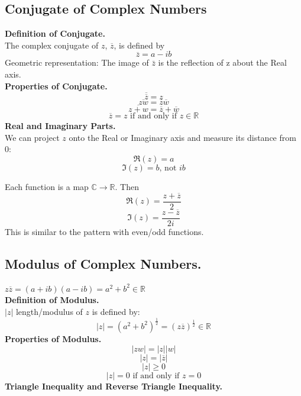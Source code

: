 \documentclass[11pt]{article}
\begin{document}
\subsection{Conjugate of Complex Numbers} 
\newcommand*\conj[1]{\overline{#1}}
\textbf{Definition of Conjugate.} \\
The complex conjugate of $z$, $\conj{z}$, is defined by 
$$\conj{z} = a - ib$$ 
Geometric representation: The image of $\bar z$ is the reflection of z about the Real axis. \\
\newline
\textbf{Properties of Conjugate.} \\
$$\conj{\conj{z}} = z$$
$$\conj{zw} = \conj{z}\conj{w}$$
$$\conj{z + w} = \conj{z} + \conj{w}$$
\begin{equation*}
\overline{z} = z \mbox{ if and only if } z \in \mathbb{R}
\end{equation*}
\textbf{Real and Imaginary Parts.} \\
\newline
\noindent We can project $z$ onto the Real or Imaginary axis and measure its distance from 0: 
$$\Re(z) = a$$
\begin{equation*}
\Im(z) = b \mbox{, not } ib
\end{equation*}

Each function is a map $\mathbb{C} \to \mathbb{R}$. Then 
$$\Re(z) = \frac{z + \conj{z}}{2}$$
$$\Im(z) = \frac{z - \conj{z}}{2i}$$
This is similar to the pattern with even/odd functions. 

\subsection{Modulus of Complex Numbers.}
$z\conj{z} = (a + ib)(a - ib) = a^2 + b^2 \in \mathbb{R}$  \\

\textbf{Definition of Modulus.} \\
$|z|$ length/modulus of $z$ is defined by:
$$|z| = (a^2 + b^2)^{\frac{1}{2}} = (z\conj{z})^{\frac{1}{2}} \in \mathbb{R}$$
\newline
\textbf{Properties of Modulus.} \\
$$|zw| = |z||w|$$ 
$$|z| = |\conj{z}|$$  
$$|z| \geqslant 0$$
\begin{equation*}
|z| = 0 \mbox{ if and only if } z = 0
\end{equation*}
\newline
\textbf{Triangle Inequality and Reverse Triangle Inequality.} \\
\end{document}
